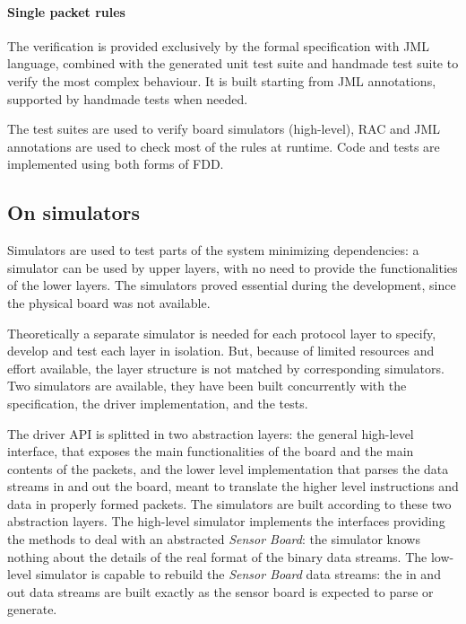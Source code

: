 \documentclass[english]{lni}
\newcommand{\SB}{\emph{Sensor Board}\xspace}
\begin{document}
\paragraph*{Single packet rules}

The verification is provided exclusively by the formal specification with JML language, combined with the generated unit test suite and handmade test suite to verify the most complex behaviour.
It is built starting from JML annotations, supported by handmade tests when needed.

The test suites are used to verify board simulators (high-level), RAC and JML annotations are used to check most of the rules at runtime.
Code and tests are implemented using both forms of FDD.



\subsection{On simulators}
\label{subsec:on_simulators}

Simulators are used to test parts of the system minimizing dependencies: a simulator can be used by upper layers, with no need to provide the functionalities of the lower layers. 
The simulators proved essential during the development, since the physical board was not available.

Theoretically a separate simulator is needed for each protocol layer to specify, develop and test each layer in isolation.  
But, because of limited resources and effort available, the layer structure is not matched by corresponding simulators.
Two simulators are available, they have been built concurrently with the specification, the driver implementation, and the tests.

The driver API is splitted in two abstraction layers: the general high-level interface, that exposes the main functionalities of the board and the main contents of the packets, and the lower level implementation that parses the data streams in and out the board, meant to translate the higher level instructions and data in properly formed packets.
The simulators are built according to these two abstraction layers.
The high-level simulator implements the interfaces providing the methods to deal with an abstracted \SB: the simulator knows nothing
about the details of the real format of the binary data streams.
The low-level simulator is capable to rebuild the \SB data streams: the in and out data streams are built exactly as the sensor board is expected to parse or generate.
\end{document}
